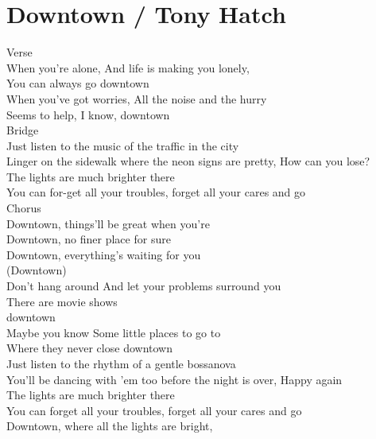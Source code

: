 \section{Downtown / Tony Hatch}\label{sec:downtown}
  
  \Aminor
  \BflatMajor
  \Cseven
  \Dminor
  \Gseven
  
  Verse\\
  When you're alone, And life is making you lonely,\\
  You can always go downtown\\
  When you've got worries, All the noise and the hurry\\
  Seems to help, I know, downtown\\
  Bridge\\
  Just listen to the music of the traffic in the city\\
  Linger on the sidewalk where the neon signs are pretty, How can you lose?\\
  The lights are much brighter there\\
  You can for-get all your troubles, forget all your cares and go\\
  Chorus\\
  Downtown, things'll be great when you're\\
  Downtown, no finer place for sure\\
  Downtown, everything's waiting for you\\
  (Downtown)\\
  Don't hang around And let your problems surround you\\
  There are movie shows\\
  downtown\\
  Maybe you know Some little places to go to\\
  Where they never close downtown\\
  Just listen to the rhythm of a gentle bossanova\\
  You'll be dancing with 'em too before the night is over, Happy again\\
  The lights are much brighter there\\
  You can forget all your troubles, forget all your cares and go\\
  Downtown, where all the lights are bright,\\
  
